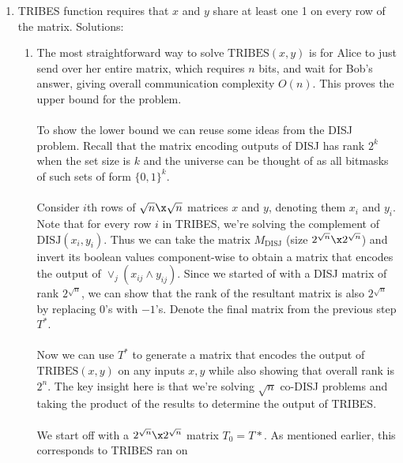 \documentclass{article}
\begin{document}
\begin{enumerate}
    \item TRIBES function requires that $x$ and $y$ share at least one 1 on
        every row of the matrix. Solutions:
        \begin{enumerate}[label=(\alph*)]
            \item The most straightforward way to solve $\textrm{TRIBES}(x, y)$
                is for Alice to just send over her entire matrix, which
                requires $n$ bits, and wait for Bob's answer, giving overall
                communication complexity $O(n)$. This proves the upper bound
                for the problem.
                \\\\ 
                To show the lower bound we can reuse some ideas from the DISJ
                problem. Recall that the matrix encoding outputs of DISJ has
                rank $2^k$ when the set size is $k$ and the universe can be
                thought of as all bitmasks of such sets of form $\{0, 1\}^k$.
                \\\\
                Consider $i$th rows of $\sqrt{n} \x \sqrt{n}$ matrices $x$ and
                $y$, denoting them $x_i$ and $y_i$. Note that for every row $i$
                in TRIBES, we're solving the complement of $\textrm{DISJ}(x_i,
                y_i)$. Thus we can take the matrix $M_{\textrm{DISJ}}$ (size
                $2^{\sqrt{n}} \x 2^{\sqrt{n}}$) and invert its boolean values
                component-wise to obtain a matrix that encodes the output of
                $\lor_j(x_{ij} \land y_{ij})$. Since we started of with a DISJ
                matrix of rank $2^{\sqrt{n}}$, we can show that the rank of the
                resultant matrix is also $2^{\sqrt{n}}$ by replacing $0$'s with
                $-1$'s. Denote the final matrix from the previous step $T^*$.
                \\\\
                Now we can use $T^*$ to generate a matrix that encodes the
                output of $\textrm{TRIBES}(x, y)$ on any inputs $x, y$ while
                also showing that overall rank is $2^n$. The key insight here
                is that we're solving $\sqrt{n}$ co-DISJ problems and taking
                the product of the results to determine the output of TRIBES. 
                \\\\
                We start off with a $2^{\sqrt{n}} \x 2^{\sqrt{n}}$ matrix $T_0
                = T*$. As mentioned earlier, this corresponds to TRIBES ran on

\end{enumerate}
\end{enumerate}
\end{document}
